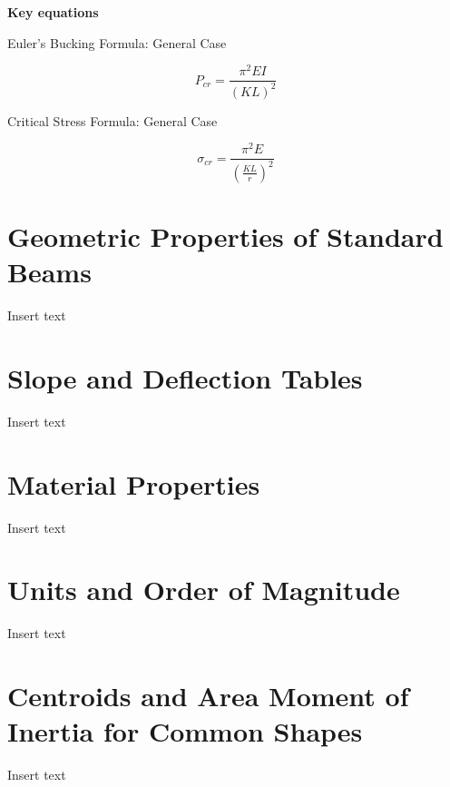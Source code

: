 \documentclass[
  letterpaper,
  DIV=11,
  numbers=noendperiod]{scrreprt}
\theoremstyle{definition}
\theoremstyle{remark}
\begin{document}
\begin{tcolorbox}[enhanced jigsaw, left=2mm, toptitle=1mm, breakable, coltitle=black, colbacktitle=quarto-callout-note-color!10!white, opacitybacktitle=0.6, bottomrule=.15mm, titlerule=0mm, leftrule=.75mm, colframe=quarto-callout-note-color-frame, bottomtitle=1mm, opacityback=0, title={Note}, arc=.35mm, colback=white, rightrule=.15mm, toprule=.15mm]

\textbf{Key equations}

Euler's Bucking Formula: General Case

\[
P_{c r}=\frac{\pi^2 E I}{(K L)^2}
\]

Critical Stress Formula: General Case

\[
\sigma_{c r}=\frac{\pi^2 E}{\left(\frac{K L}{r}\right)^2}
\]

\end{tcolorbox}

\cleardoublepage
{}
{}
\appendix

\chapter{Geometric Properties of Standard
Beams}\label{sec-geometric-properties-of-standard-beams}

Insert text

\chapter{Slope and Deflection
Tables}\label{sec-slope-and-deflection-tables}

Insert text

\chapter{Material Properties}\label{sec-material-properties}

Insert text

\chapter{Units and Order of
Magnitude}\label{sec-units-and-order-of-magnitude}

Insert text

\chapter{Centroids and Area Moment of Inertia for Common
Shapes}\label{sec-centroids-moments-inertia}

Insert text
\end{document}
